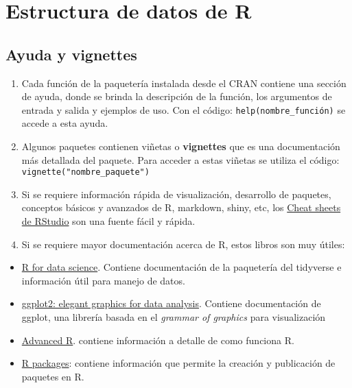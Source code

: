 \documentclass[]{book}
\begin{document}
\hypertarget{estructura-de-datos-de-r}{%
\chapter{Estructura de datos de R}\label{estructura-de-datos-de-r}}

\hypertarget{ayuda-y-vignettes}{%
\section{Ayuda y vignettes}\label{ayuda-y-vignettes}}

\begin{enumerate}
\def\labelenumi{\arabic{enumi}.}
\item
  Cada función de la paquetería instalada desde el CRAN contiene una sección de ayuda, donde se brinda la descripción de la función, los argumentos de entrada y salida y ejemplos de uso. Con el código: \texttt{help(nombre\_función)} se accede a esta ayuda.
\item
  Algunos paquetes contienen viñetas o \textbf{vignettes} que es una documentación más detallada del paquete. Para acceder a estas viñetas se utiliza el código: \texttt{vignette("nombre\_paquete")}
\item
  Si se requiere información rápida de visualización, desarrollo de paquetes, conceptos básicos y avanzados de R, markdown, shiny, etc, los \href{https://www.rstudio.com/resources/cheatsheets/}{Cheat sheets de RStudio} son una fuente fácil y rápida.
\item
  Si se requiere mayor documentación acerca de R, estos libros son muy útiles:
\end{enumerate}

\begin{itemize}
\item
  \href{http://r4ds.had.co.nz/}{R for data science}. Contiene documentación de la paquetería del tidyverse e información útil para manejo de datos.
\item
  \href{http://hadley.nz/}{ggplot2: elegant graphics for data analysis}. Contiene documentación de ggplot, una librería basada en el \emph{grammar of graphics} para visualización
\item
  \href{http://adv-r.had.co.nz/}{Advanced R}. contiene información a detalle de como funciona R.
\item
  \href{http://r-pkgs.had.co.nz/}{R packages}: contiene información que permite la creación y publicación de paquetes en R.
\end{itemize}
\end{document}

